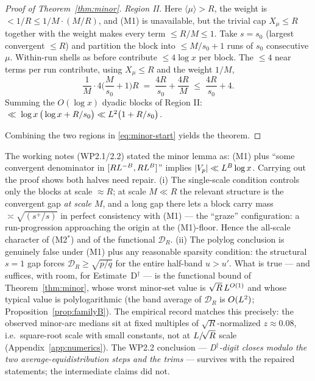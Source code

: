 \begin{proof}[Proof of Theorem~\ref{thm:minor}]
\medskip\noindent\emph{Region II.} Here $\langle\mu\rangle>R$, the weight
is $<1/R\le1/M\cdot(M/R)$, and (M1) is unavailable, but the trivial cap
$X_\mu\le R$ together with the weight makes every term $\le R/M\le1$.
Take $s=s_0$ (largest convergent $\le R$) and partition the block into
$\le M/s_0+1$ runs of $s_0$ consecutive $\mu$. Within-run shells as
before contribute $\le4\log x$ per block. The $\le4$ near terms per run
contribute, using $X_\mu\le R$ and the weight $1/M$,
\[
\frac1M\cdot4\Big(\frac M{s_0}+1\Big)R
\;=\;\frac{4R}{s_0}+\frac{4R}{M}
\;\le\;\frac{4R}{s_0}+4 .
\]
Summing the $O(\log x)$ dyadic blocks of Region II:
$\;\ll\;\log x\,\big(\log x+R/s_0\big)
\ll L^2\big(1+R/s_0\big)$.

\medskip Combining the two regions in \eqref{eq:minor-start} yields the
theorem.
\end{proof}

\begin{remark}
\label{rem:M2-strengthening}
The working notes (WP2.1/2.2) stated the minor lemma as: (M1) plus
``some convergent denominator in $[RL^{-B},RL^{B}]$'' implies
$|V_p|\ll L^{B}\log x$. Carrying out the proof shows both halves need
repair. (i) The single-scale condition controls only the blocks at scale
$\approx R$; at scale $M\ll R$ the relevant structure is the convergent
gap \emph{at scale $M$}, and a long gap there lets a block carry mass
$\asymp\sqrt{(s^{+}/s)}$ in perfect consistency with (M1) --- the
``graze'' configuration: a run-progression approaching the origin at the
(M1)-floor. Hence the all-scale character of (M2$^*$) and of the
functional $\mathcal D_R$. (ii) The polylog conclusion is genuinely false
under (M1) plus any reasonable sparsity condition: the structural $s=1$
gap forces $\mathcal D_R\ge\sqrt{p/q}$ for the entire half-band $u>u'$.
What is true --- and suffices, with room, for
Estimate~D$^\dagger$ --- is the functional bound of
Theorem~\ref{thm:minor}, whose worst minor-set value is
$\sqrt R\,L^{O(1)}$ and whose typical value is polylogarithmic
(the band average of $\mathcal D_R$ is $O(L^2)$;
Proposition~\ref{prop:familyB}). The empirical record matches this
precisely: the observed minor-arc medians sit at fixed multiples of
$\sqrt R$-normalized $z\approx0.08$, i.e.\ square-root scale with small
constants, not at $L/\!\sqrt R$ scale
(Appendix~\ref{app:numerics}). The WP2.2 conclusion ---
\emph{D$^\dagger$-digit closes modulo the two average-equidistribution
steps and the trims} --- survives with the repaired statements; the
intermediate claims did not.
\end{remark}
